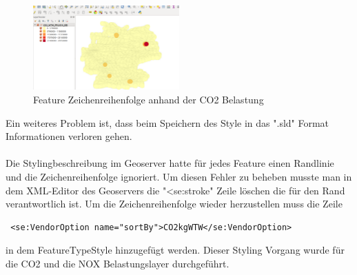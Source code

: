 \begin{figure}
\centering
	\includegraphics[width=0.5\textwidth]{images/zeichenreihenfolge.png}
	\caption{Feature Zeichenreihenfolge anhand der CO2 Belastung}
\end{figure}
Ein weiteres Problem ist, dass beim Speichern des Style in das ".sld" Format Informationen verloren gehen.
\\\\
Die Stylingbeschreibung im Geoserver hatte für jedes Feature einen Randlinie und die Zeichenreihenfolge ignoriert.
Um diesen Fehler zu beheben musste man in dem XML-Editor des Geoservers die "<se:stroke" Zeile löschen die für den Rand verantwortlich ist.
Um die Zeichenreihenfolge wieder herzustellen muss die Zeile
\begin{lstlisting}
 <se:VendorOption name="sortBy">CO2kgWTW</se:VendorOption>
\end{lstlisting}
in dem FeatureTypeStyle hinzugefügt werden.
Dieser Styling Vorgang wurde für die CO2 und die NOX Belastungslayer durchgeführt.
